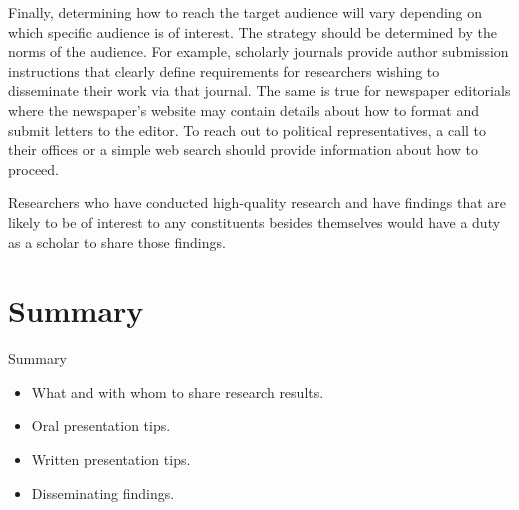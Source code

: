 Finally, determining how to reach the target audience will vary depending on which specific audience is of interest. The strategy should be determined by the norms of the audience. For example, scholarly journals provide author submission instructions that clearly define requirements for researchers wishing to disseminate their work via that journal. The same is true for newspaper editorials where the newspaper's website may contain details about how to format and submit letters to the editor. To reach out to political representatives, a call to their offices or a simple web search should provide information about how to proceed.

Researchers who have conducted high-quality research and have findings that are likely to be of interest to any constituents besides themselves would have a duty as a scholar to share those findings. 

\section{Summary}\label{ch15:summary}

\begin{center}
	\begin{tkawybox}{Summary}
		\begin{itemize}
			\setlength{\itemsep}{0pt}
			\setlength{\parskip}{0pt}
			\setlength{\parsep}{0pt}
			
			\item What and with whom to share research results.
			\item Oral presentation tips.
			\item Written presentation tips.
			\item Disseminating findings.

		\end{itemize}
	\end{tkawybox}
\end{center}
